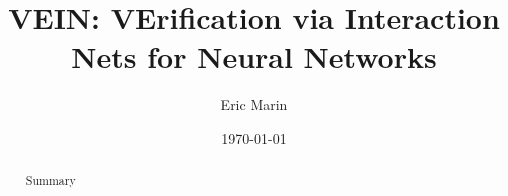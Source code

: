 \documentclass[12pt,a4paper,twoside]{report}
\title{VEIN: VErification via Interaction Nets for Neural Networks}
\author{Eric Marin}
\date{\today}
\begin{document}
\maketitle

\begin{abstract}
	Summary
\end{abstract}

\tableofcontents













\end{document}
